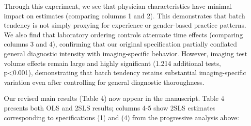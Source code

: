 \documentclass[11pt]{article}
\newcommand{\1}{\hbox{\rm 1\kern-.35em 1}}
\begin{document}
Through this experiment, we see that physician characteristics have minimal impact on estimates (comparing columns 1 and 2). This demonstrates that batch tendency is not simply proxying for experience or gender-based practice patterns. We also find that laboratory ordering controls attenuate time effects (comparing columns 3 and 4), confirming that our original specification partially conflated general diagnostic intensity with imaging-specific behavior. However, imaging test volume effects remain large and highly significant (1.214 additional tests, p<0.001), demonstrating that batch tendency retains substantial imaging-specific variation even after controlling for general diagnostic thoroughness.

Our revised main results (Table 4) now appear in the manuscript. Table 4 presents both OLS and 2SLS results; columns 4-5 show 2SLS estimates corresponding to specifications (1) and (4) from the progressive analysis above:
\end{document}
